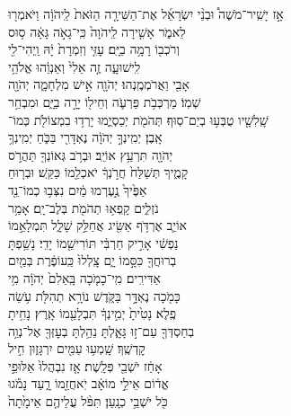 \documentclass[11pt, openany]{book}
\begin{document}
\label{shirathayam}\large
אָ֣ז \hfill
יָשִֽׁיר־מֹשֶׁה֩ \hfill וּבְנֵ֨י \hfill יִשְׂרָאֵ֜ל \hfill אֶת־הַשִּׁירָ֤ה \hfill הַזֹּאת֙ \hfill לַֽיהֹוָ֔ה \hfill וַיֹּאמְר֖וּ \\
לֵאמֹ֑ר \hfill אָשִׁ֤ירָה לַֽיהֹוָה֙ כִּֽי־גָאֹ֣ה גָּאָ֔ה \hfill ס֥וּס \\
וְרֹכְב֖וֹ רָמָ֥ה בַיָּֽם׃ \hfill עׇזִּ֤י וְזִמְרָת֙ יָ֔הּ וַֽיְהִי־לִ֖י \\
לִֽישׁוּעָ֑ה \hfill זֶ֤ה אֵלִי֙ וְאַנְוֵ֔הוּ \hfill אֱלֹהֵ֥י \\
אָבִ֖י וַאֲרֹמְמֶֽנְהוּ׃ \hfill יְהֹוָ֖ה אִ֣ישׁ מִלְחָמָ֑ה יְהֹוָ֖ה \\
שְׁמֽוֹ׃ \hfill מַרְכְּבֹ֥ת פַּרְעֹ֛ה וְחֵיל֖וֹ יָרָ֣ה בַיָּ֑ם \hfill וּמִבְחַ֥ר\\
שָֽׁלִשָׁ֖יו טֻבְּע֥וּ בְיַם־סֽוּף׃ \hfill תְּהֹמֹ֖ת יְכַסְיֻ֑מוּ יָרְד֥וּ בִמְצוֹלֹ֖ת כְּמוֹ־\\
אָֽבֶן׃ \hfill יְמִֽינְךָ֣ יְהֹוָ֔ה נֶאְדָּרִ֖י בַּכֹּ֑חַ \hfill יְמִֽינְךָ֥ \\
יְהֹוָ֖ה תִּרְעַ֥ץ אוֹיֵֽב׃ \hfill וּבְרֹ֥ב גְּאוֹנְךָ֖ תַּהֲרֹ֣ס \\
קָמֶ֑יךָ \hfill תְּשַׁלַּח֙ חֲרֹ֣נְךָ֔ יֹאכְלֵ֖מוֹ כַּקַּֽשׁ׃ \hfill וּבְר֤וּחַ \\
אַפֶּ֙יךָ֙ נֶ֣עֶרְמוּ מַ֔יִם \hfill נִצְּב֥וּ כְמוֹ־נֵ֖ד \\
נֹזְלִ֑ים \hfill קָֽפְא֥וּ תְהֹמֹ֖ת בְּלֶב־יָֽם׃ \hfill אָמַ֥ר \\
אוֹיֵ֛ב אֶרְדֹּ֥ף אַשִּׂ֖יג \hfill אֲחַלֵּ֣ק שָׁלָ֑ל תִּמְלָאֵ֣מוֹ \\
נַפְשִׁ֔י \hfill אָרִ֣יק חַרְבִּ֔י תּוֹרִישֵׁ֖מוֹ יָדִֽי׃ \hfill נָשַׁ֥פְתָּ \\
בְרוּחֲךָ֖ כִּסָּ֣מוֹ יָ֑ם \hfill צָֽלְלוּ֙ כַּֽעוֹפֶ֔רֶת בְּמַ֖יִם \\
אַדִּירִֽים׃ \hfill מִֽי־כָמֹ֤כָה בָּֽאֵלִם֙ יְהֹוָ֔ה \hfill מִ֥י \\
כָּמֹ֖כָה נֶאְדָּ֣ר בַּקֹּ֑דֶשׁ \hfill נוֹרָ֥א תְהִלֹּ֖ת עֹ֥שֵׂה \\
פֶֽלֶא׃ \hfill נָטִ֙יתָ֙ יְמִ֣ינְךָ֔ תִּבְלָעֵ֖מוֹ אָֽרֶץ׃ \hfill נָחִ֥יתָ \\
בְחַסְדְּךָ֖ עַם־ז֣וּ גָּאָ֑לְתָּ \hfill נֵהַ֥לְתָּ בְעׇזְּךָ֖ אֶל־נְוֵ֥ה \\
קׇדְשֶֽׁךָ׃ \hfill שָֽׁמְע֥וּ עַמִּ֖ים יִרְגָּז֑וּן \hfill חִ֣יל \\
אָחַ֔ז יֹשְׁבֵ֖י פְּלָֽשֶׁת׃ \hfill אָ֤ז נִבְהֲלוּ֙ אַלּוּפֵ֣י \\
אֱד֔וֹם \hfill אֵילֵ֣י מוֹאָ֔ב יֹֽאחֲזֵ֖מוֹ רָ֑עַד \hfill נָמֹ֕גוּ \\
כֹּ֖ל יֹשְׁבֵ֥י כְנָֽעַן׃ \hfill תִּפֹּ֨ל עֲלֵיהֶ֤ם אֵימָ֙תָה֙ \\
\end{document}
